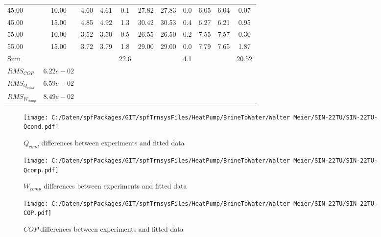 \documentclass[english]{SPFShortReport}
\begin{document}
\begin{table}[!ht]
\begin{small}
\begin{center}
{\begin{tabular}{l | c c c c c c c c c c }
45.00  & 10.00 & 4.60 & 4.61 & 0.1 & 27.82 & 27.83 & 0.0 & 6.05 & 6.04 & 0.07\\ 
45.00  & 15.00 & 4.85 & 4.92 & 1.3 & 30.42 & 30.53 & 0.4 & 6.27 & 6.21 & 0.95\\ 
55.00  & 10.00 & 3.52 & 3.50 & 0.5 & 26.55 & 26.50 & 0.2 & 7.55 & 7.57 & 0.30\\ 
55.00  & 15.00 & 3.72 & 3.79 & 1.8 & 29.00 & 29.00 & 0.0 & 7.79 & 7.65 & 1.87\\ 
\hline 
 Sum &  & &  & 22.6 &  &  & 4.1 & &  & 20.52\\ 
\hline 
 $RMS_{COP}$ & $6.22e-02$ \\ 
 $RMS_{Q_{cond}}$ & $6.59e-02$ \\ 
 $RMS_{W_{comp}}$ & $8.49e-02$ \\ 
\hline
\hline
\end{tabular}
}
\label{ErrorsTable}
\end{center}
\end{small}
\end{table}
\begin{figure}[!ht]
\begin{center}
\texttt{[image: C:/Daten/spfPackages/GIT/spfTrnsysFiles/HeatPump/BrineToWater/Walter Meier/SIN-22TU/SIN-22TU-Qcond.pdf]}
\caption{$Q_{cond}$ differences between experiments and fitted data}
\label{QcongFig}
\end{center}
\end{figure}
\begin{figure}[!ht]
\begin{center}
\texttt{[image: C:/Daten/spfPackages/GIT/spfTrnsysFiles/HeatPump/BrineToWater/Walter Meier/SIN-22TU/SIN-22TU-Qcomp.pdf]}
\caption{$W_{comp}$ differences between experiments and fitted data}
\label{QcompFig}
\end{center}
\end{figure}
\begin{figure}[!ht]
\begin{center}
\texttt{[image: C:/Daten/spfPackages/GIT/spfTrnsysFiles/HeatPump/BrineToWater/Walter Meier/SIN-22TU/SIN-22TU-COP.pdf]}
\caption{$COP$ differences between experiments and fitted data}
\label{COPFig}
\end{center}
\end{figure}
\end{document}
